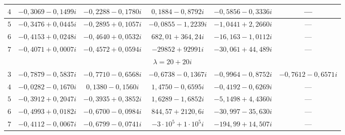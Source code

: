 \begin{table}[h!]
\begin{tabular}{c|c|c|c|c|c}
      \hline

      $4$&$-0{,}3069-0{,}1499i$&$-0{,}2288-0{,}1780i$&$0{,}1884-0{,}8792i$&$-0{,}5856-0{,}3336i$&---\\

      \hline

      $5$&$-0{,}3476+0{,}0445i$&$-0{,}2895+0{,}1057i$&$-0{,}0855-1{,}2239i$&$-1{,}0441+2{,}2660i$&---\\

      \hline

      $6$&$-0{,}4153+0{,}0248i$&$-0{,}4640+0{,}0532i$&$682{,}01+364{,}24i$&$-16{,}163-1{,}0112i$&---\\

      \hline

      $7$&$-0{,}4071+0{,}0007i$&$-0{,}4572+0{,}0594i$&$-29852+92991i$&$-30{,}061+44{,}489i$&---\\

      \hline

      \multicolumn{6}{c}{$\lambda=20+20i$}\\

      \hline

      $3$&$-0{,}7879-0{,}5837i$&$-0{,}7710-0{,}6568i$&$-0{,}6738-0{,}1367i$&$-0{,}9964-0{,}8752i$&$-0{,}7612-0{,}6571i$\\

      \hline

      $4$&$-0{,}0282-0{,}1670i$&$0{,}1380-0{,}1560i$&$1{,}4750-0{,}6595i$&$-0{,}4192-0{,}6269i$&---\\

      \hline

      $5$&$-0{,}3912+0{,}2047i$&$-0{,}3935+0{,}3852i$&$1{,}6289-1{,}6852i$&$-5{,}1498+4{,}4360i$&---\\

      \hline

      $6$&$-0{,}4993+0{,}0182i$&$-0{,}6700-0{,}0984i$&$844{,}57+2120{,}6i$&$-30{,}997-35{,}630i$&---\\

      \hline

      $7$&$-0{,}4112-0{,}0067i$&$-0{,}6799-0{,}0741i$&$-3\cdot10^5+1\cdot10^5i$&$-194{,}99+14{,}507i$&---\\

      \hline

    \end{tabular}

\end{table}





